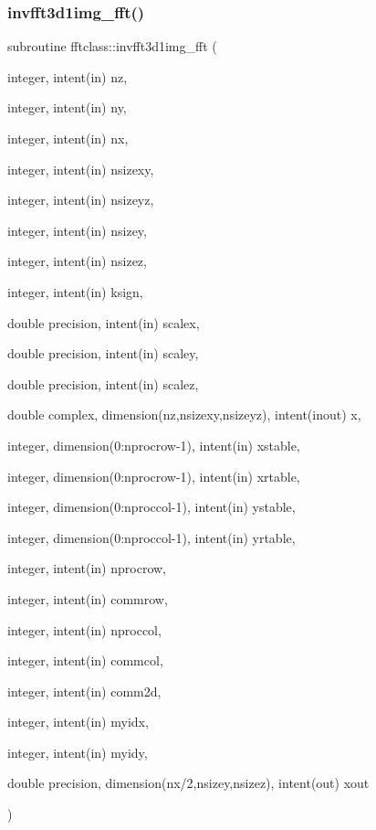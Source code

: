 \subsubsection{\texorpdfstring{invfft3d1img\_fft()}{invfft3d1img\_fft()}}
{\footnotesize\ttfamily subroutine fftclass\+::invfft3d1img\+\_\+fft (\begin{DoxyParamCaption}\item[{integer, intent(in)}]{nz,  }\item[{integer, intent(in)}]{ny,  }\item[{integer, intent(in)}]{nx,  }\item[{integer, intent(in)}]{nsizexy,  }\item[{integer, intent(in)}]{nsizeyz,  }\item[{integer, intent(in)}]{nsizey,  }\item[{integer, intent(in)}]{nsizez,  }\item[{integer, intent(in)}]{ksign,  }\item[{double precision, intent(in)}]{scalex,  }\item[{double precision, intent(in)}]{scaley,  }\item[{double precision, intent(in)}]{scalez,  }\item[{double complex, dimension(nz,nsizexy,nsizeyz), intent(inout)}]{x,  }\item[{integer, dimension(0\+:nprocrow-\/1), intent(in)}]{xstable,  }\item[{integer, dimension(0\+:nprocrow-\/1), intent(in)}]{xrtable,  }\item[{integer, dimension(0\+:nproccol-\/1), intent(in)}]{ystable,  }\item[{integer, dimension(0\+:nproccol-\/1), intent(in)}]{yrtable,  }\item[{integer, intent(in)}]{nprocrow,  }\item[{integer, intent(in)}]{commrow,  }\item[{integer, intent(in)}]{nproccol,  }\item[{integer, intent(in)}]{commcol,  }\item[{integer, intent(in)}]{comm2d,  }\item[{integer, intent(in)}]{myidx,  }\item[{integer, intent(in)}]{myidy,  }\item[{double precision, dimension(nx/2,nsizey,nsizez), intent(out)}]{xout }\end{DoxyParamCaption})}

